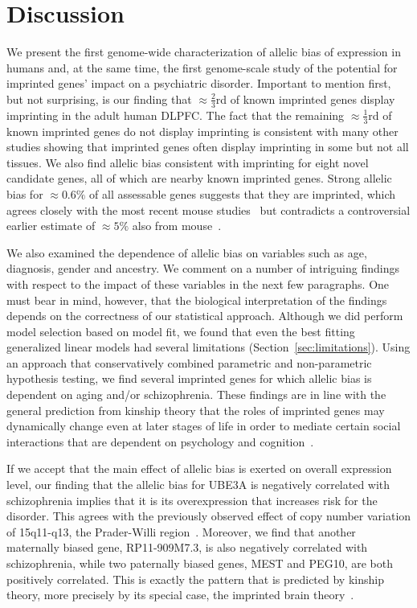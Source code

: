 \documentclass[12pt,letterpaper]{article}
\begin{document}
\section{Discussion}

We present the first genome-wide characterization of allelic bias of
expression in humans and, at the same time, the first genome-scale study of
the potential for imprinted genes' impact on a psychiatric disorder. Important
to mention first, but not surprising, is our finding that \(\approx
\frac{2}{3}\)rd of known imprinted genes display imprinting in the adult human
DLPFC. The fact that the remaining \(\approx \frac{1}{3}\)rd of known
imprinted genes do not display imprinting is consistent with many other
studies showing that imprinted genes often display imprinting in some but not
all tissues. We also find allelic bias consistent with imprinting for eight
novel candidate genes, all of which are nearby known imprinted genes.  Strong
allelic bias for \(\approx 0.6\%\) of all assessable genes suggests that they
are imprinted, which agrees closely with the most recent mouse
studies~\cite{DeVeale2012,Perez2015} but contradicts a controversial earlier
estimate of \(\approx 5\%\) also from mouse~\cite{Gregg2010a}.

We also examined the dependence of allelic bias on variables such as age,
diagnosis, gender and ancestry. We comment on a number of intriguing findings
with respect to the impact of these variables in the next few paragraphs.  One
must bear in mind, however, that the biological interpretation of the findings
depends on the correctness of our statistical approach.  Although we did
perform model selection based on model fit, we found that even the best
fitting generalized linear models had several limitations
(Section~\ref{sec:limitations}).  Using an approach that conservatively
combined parametric and non-parametric hypothesis testing, we find several
imprinted genes for which allelic bias is dependent on aging and/or
schizophrenia. These findings are in line with the general prediction from
kinship theory that the roles of imprinted genes may dynamically change even
at later stages of life in order to mediate certain social interactions that
are dependent on psychology and cognition~\cite{Ubeda2012,Wilkins2003}.

If we accept that the main effect of allelic bias is exerted on overall expression
level, our finding that the allelic bias for UBE3A is negatively correlated
with schizophrenia implies that it is its overexpression that increases risk
for the disorder.  This agrees with the previously observed effect of copy
number variation of 15q11-q13, the Prader-Willi region~\cite{McNamara2013}.
Moreover, we find that another maternally biased gene, RP11-909M7.3, is also
negatively correlated with schizophrenia, while two paternally biased genes,
MEST and PEG10, are both positively correlated.  This is exactly the pattern
that is predicted by kinship theory, more precisely by its special case, the
imprinted brain theory~\cite{Crespi2008a}.
\end{document}

